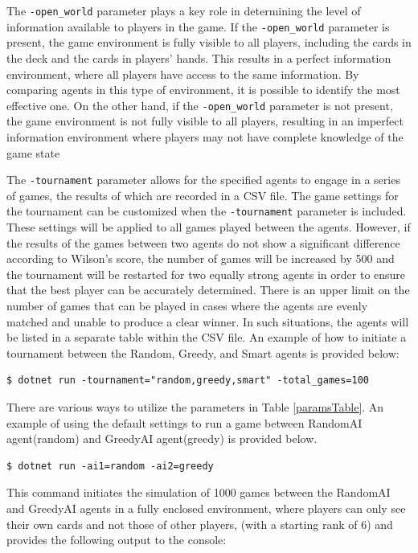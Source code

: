 The \texttt{-open\_world} parameter plays a key role in determining the level of information available to players in the game. If the \texttt{-open\_world} parameter is present, the game environment is fully visible to all players, including the cards in the deck and the cards in players' hands. This results in a perfect information environment, where all players have access to the same information. By comparing agents in this type of environment, it is possible to identify the most effective one. On the other hand, if the \texttt{-open\_world} parameter is not present, the game environment is not fully visible to all players, resulting in an imperfect information environment where players may not have complete knowledge of the game state

The \texttt{-tournament} parameter allows for the specified agents to engage in a series of games, the results of which are recorded in a CSV file. The game settings for the tournament can be customized when the \texttt{-tournament} parameter is included. These settings will be applied to all games played between the agents. However, if the results of the games between two agents do not show a significant difference according to Wilson's score, the number of games will be increased by 500 and the tournament will be restarted for two equally strong agents in order to ensure that the best player can be accurately determined. There is an upper limit on the number of games that can be played in cases where the agents are evenly matched and unable to produce a clear winner. In such situations, the agents will be listed in a separate table within the CSV file. An example of how to initiate a tournament between the Random, Greedy, and Smart agents is provided below:

\begin{lstlisting}
$ dotnet run -tournament="random,greedy,smart" -total_games=100
\end{lstlisting}

There are various ways to utilize the parameters in Table \ref{paramsTable}. An example of using the default settings to run a game between RandomAI agent(random) and GreedyAI agent(greedy) is provided below.

\begin{lstlisting}
$ dotnet run -ai1=random -ai2=greedy
\end{lstlisting}

This command initiates the simulation of 1000 games between the RandomAI and GreedyAI agents in a fully enclosed environment, where players can only see their own cards and not those of other players, (with a starting rank of 6) and provides the following output to the console:

